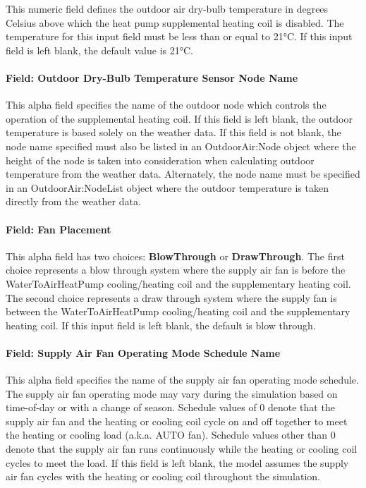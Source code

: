 This numeric field defines the outdoor air dry-bulb temperature in degrees Celsius above which the heat pump supplemental heating coil is disabled. The temperature for this input field must be less than or equal to 21°C. If this input field is left blank, the default value is 21°C.

\paragraph{Field: Outdoor Dry-Bulb Temperature Sensor Node Name}\label{field-outdoor-dry-bulb-temperature-sensor-node-name-000}

This alpha field specifies the name of the outdoor node which controls the operation of the supplemental heating coil. If this field is left blank, the outdoor temperature is based solely on the weather data. If this field is not blank, the node name specified must also be listed in an OutdoorAir:Node object where the height of the node is taken into consideration when calculating outdoor temperature from the weather data. Alternately, the node name must be specified in an OutdoorAir:NodeList object where the outdoor temperature is taken directly from the weather data.

\paragraph{Field: Fan Placement}\label{field-fan-placement-5-000}

This alpha field has two choices: \textbf{BlowThrough} or \textbf{DrawThrough}. The first choice represents a blow through system where the supply air fan is before the WaterToAirHeatPump cooling/heating coil and the supplementary heating coil. The second choice represents a draw through system where the supply fan is between the WaterToAirHeatPump cooling/heating coil and the supplementary heating coil. If this input field is left blank, the default is blow through.

\paragraph{Field: Supply Air Fan Operating Mode Schedule Name}\label{field-supply-air-fan-operating-mode-schedule-name-6}

This alpha field specifies the name of the supply air fan operating mode schedule. The supply air fan operating mode may vary during the simulation based on time-of-day or with a change of season. Schedule values of 0 denote that the supply air fan and the heating or cooling coil cycle on and off together to meet the heating or cooling load (a.k.a. AUTO fan). Schedule values other than 0 denote that the supply air fan runs continuously while the heating or cooling coil cycles to meet the load. If this field is left blank, the model assumes the supply air fan cycles with the heating or cooling coil throughout the simulation.

